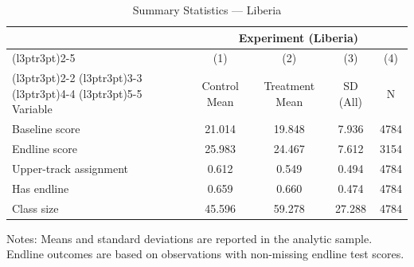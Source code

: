\begin{table}[H]
\centering
\caption{Summary Statistics --- Liberia}
\label{tab:lib_sumstats}
\begin{threeparttable}
\begin{tabular}[t]{lcccc}
\toprule
\multicolumn{1}{c}{ } & \multicolumn{4}{c}{Experiment (Liberia)} \\
\cmidrule(l{3pt}r{3pt}){2-5}
\multicolumn{1}{c}{ } & \multicolumn{1}{c}{(1)} & \multicolumn{1}{c}{(2)} & \multicolumn{1}{c}{(3)} & \multicolumn{1}{c}{(4)} \\
\cmidrule(l{3pt}r{3pt}){2-2} \cmidrule(l{3pt}r{3pt}){3-3} \cmidrule(l{3pt}r{3pt}){4-4} \cmidrule(l{3pt}r{3pt}){5-5}
Variable & Control Mean & Treatment Mean & SD (All) & N \\
\midrule
Baseline score &  21.014 &  19.848 &   7.936 & 4784 \\
Endline score &  25.983 &  24.467 &   7.612 & 3154 \\
Upper-track assignment &   0.612 &   0.549 &   0.494 & 4784 \\
Has endline &   0.659 &   0.660 &   0.474 & 4784 \\
Class size &  45.596 &  59.278 &  27.288 & 4784 \\
\bottomrule
\end{tabular}
\begin{tablenotes}[para]
\item Notes: Means and standard deviations are reported in the analytic sample. Endline outcomes are based on observations with non-missing endline test scores.
\end{tablenotes}
\end{threeparttable}
\end{table}
